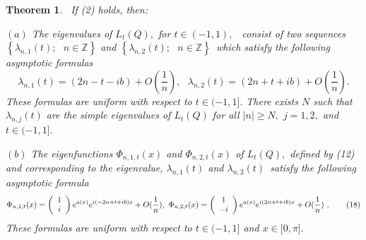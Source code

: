 \documentclass{article}%
\newtheorem{theorem}{Theorem}
{}
\begin{document}
\begin{theorem}
\textit{\ If} (2) holds, \textit{then: }

$(a)$ \textit{The eigenvalues of }$L_{t}(Q),$ for $t\in(-1,1),$%
\textit{\ consist of two sequences }$\left\{  \lambda_{n,1}(t);\text{ }%
n\in\mathbb{Z}\right\}  $ and $\left\{  \lambda_{n,2}(t);\text{ }%
n\in\mathbb{Z}\right\}  $\ which satisfy the following asymptotic formulas%
\begin{equation}
\lambda_{n,1}(t)=(2n-t-ib)+O(\frac{1}{n}),\text{ }\lambda_{n,2}%
(t)=(2n+t+ib)+O(\frac{1}{n}). \tag{17}%
\end{equation}
These formulas are uniform with respect to $t\in(-1,1].$ There exists $N$ such
that $\lambda_{n,j}(t)$ are the simple eigenvalues of $L_{t}(Q)$ for all
$\left\vert n\right\vert \geq N,$ $j=1,2,$ and $t\in(-1,1].$

$(b)$ The\textit{ }eigenfunctions $\Phi_{n,1,t}(x)$ and $\Phi_{n,2,t}(x)$ of
$L_{t}(Q),$ defined by (12) and corresponding to the eigenvalue,
$\lambda_{n,1}(t)$ and $\lambda_{n,2}(t)$\ \textit{satisfy} the following
asymptotic formula%
\begin{equation}
\Phi_{n,1,t}(x)=\left(
\begin{array}
[c]{c}%
1\\
i
\end{array}
\right)  e^{a(x)}e^{i(-2n+t+ib)x}+O(\frac{1}{n}),\text{ }\Phi_{n,2,t}%
(x)=\left(
\begin{array}
[c]{c}%
1\\
-i
\end{array}
\right)  e^{a(x)}e^{i(2n+t+ib)x}+O(\frac{1}{n})\text{ }, \tag{18}%
\end{equation}
These formulas are uniform with respect to $t\in(-1,1]$ and $x\in\lbrack
0,\pi].$
\end{theorem}
\end{document}
